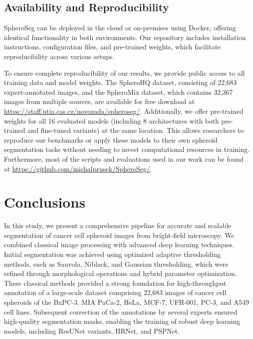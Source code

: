 \documentclass[preprint,12pt]{elsarticle}
\newcommand{\app}{SpheroSeg}
\newcommand{\dsHQ}{SpheroHQ}
\newcommand{\dsMix}{SpheroMix}
\begin{document}
\subsection{Availability and Reproducibility}
\app{} can be deployed in the cloud or on-premises using Docker, offering identical functionality in both environments. Our repository includes installation instructions, configuration files, and pre-trained weights, which facilitate reproducibility across various setups.

To ensure complete reproducibility of our results, we provide public access to all training data and model weights. The \dsHQ{} dataset, consisting of 22,683 expert-annotated images, and the \dsMix{} dataset, which contains 32,367 images from multiple sources, are available for free download at \href{https://staff.utia.cas.cz/novozada/spheroseg/}{https://staff.utia.cas.cz/novozada/spheroseg/}. Additionally, we offer pre-trained weights for all 16 evaluated models (including 8 architectures with both pre-trained and fine-tuned variants) at the same location. This allows researchers to reproduce our benchmarks or apply these models to their own spheroid segmentation tasks without needing to invest computational resources in training. Furthermore, most of the scripts and evaluations used in our work can be found at \href{https://github.com/michalprusek/SpheroSeg/}{https://github.com/michalprusek/SpheroSeg/}.

\section{Conclusions}
\label{sec:conclusions}
In this study, we present a comprehensive pipeline for accurate and scalable segmentation of cancer cell spheroid images from bright-field microscopy. We combined classical image processing with advanced deep learning techniques. Initial segmentation was achieved using optimized adaptive thresholding methods, such as Sauvola, Niblack, and Gaussian thresholding, which were refined through morphological operations and hybrid parameter optimization. These classical methods provided a strong foundation for high-throughput annotation of a large-scale dataset comprising 22,683 images of cancer cell spheroids of the BxPC-3, MIA PaCa-2, HeLa, MCF-7, UFH-001, PC-3, and A549 cell lines. Subsequent correction of the annotations by several experts ensured high-quality segmentation masks, enabling the training of robust deep learning models, including ResUNet variants, HRNet, and PSPNet. 
\end{document}

